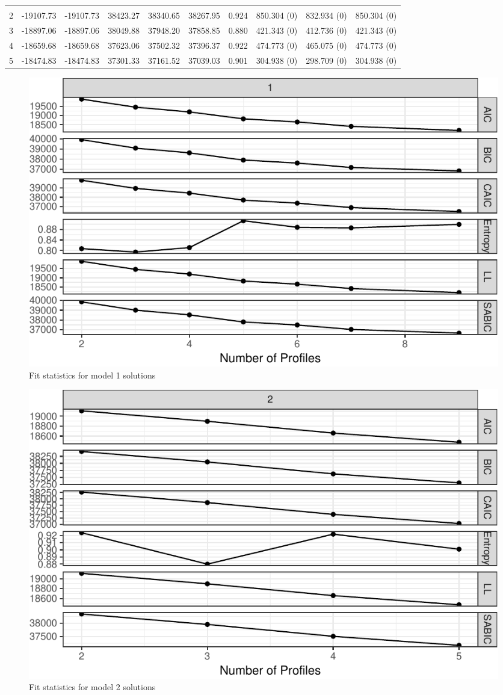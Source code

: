 \documentclass[]{msu-thesis}
\theoremstyle{definition}
\theoremstyle{definition}
\theoremstyle{definition}
\theoremstyle{remark}
\begin{document}
\begin{landscape}
\begin{table}
{\begin{tabular}[t]{rrrrrrrlll}
\addlinespace[0.3em]
\multicolumn{10}{l}{\textbf{Model 2}}\\
\hspace{1em}2 & -19107.73 & -19107.73 & 38423.27 & 38340.65 & 38267.95 & 0.924 & 850.304 (0) & 832.934 (0) & 850.304 (0)\\
\hspace{1em}3 & -18897.06 & -18897.06 & 38049.88 & 37948.20 & 37858.85 & 0.880 & 421.343 (0) & 412.736 (0) & 421.343 (0)\\
\hspace{1em}4 & -18659.68 & -18659.68 & 37623.06 & 37502.32 & 37396.37 & 0.922 & 474.773 (0) & 465.075 (0) & 474.773 (0)\\
\hspace{1em}5 & -18474.83 & -18474.83 & 37301.33 & 37161.52 & 37039.03 & 0.901 & 304.938 (0) & 298.709 (0) & 304.938 (0)\\
\bottomrule
\end{tabular}}
\end{table}
\end{landscape}

\begin{figure}

{\centering \includegraphics[width=0.5\linewidth]{rosenberg-dissertation_files/figure-latex/model1-1} 

}

\caption{Fit statistics for model 1 solutions}\label{fig:model1}
\end{figure}

\begin{figure}

{\centering \includegraphics[width=0.4\linewidth]{rosenberg-dissertation_files/figure-latex/model2-1} 

}

\caption{Fit statistics for model 2 solutions}\label{fig:model2}
\end{figure}
\end{document}
